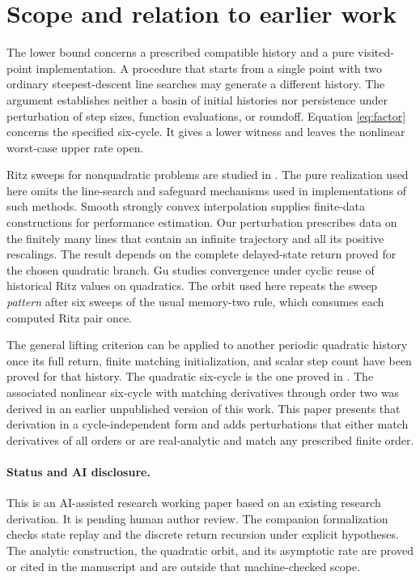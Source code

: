 \documentclass[11pt]{article}
\begin{document}
\section{Scope and relation to earlier work}

The lower bound concerns a prescribed compatible history and a
pure visited-point implementation. A procedure that starts from a
single point with two ordinary steepest-descent line searches may
generate a different history. The argument establishes neither
a basin of initial histories nor persistence under perturbation of
step sizes, function evaluations, or roundoff. Equation
\eqref{eq:factor} concerns the specified six-cycle. It gives a
lower witness and leaves the nonlinear worst-case upper rate open.

Ritz sweeps for nonquadratic problems are studied in
\cite{fletcher,ferrandi}. The pure realization used here omits the
line-search and safeguard mechanisms used in implementations of such
methods. Smooth strongly convex interpolation \cite{taylor} supplies
finite-data constructions for performance estimation. Our
perturbation prescribes data on the finitely many lines that contain
an infinite trajectory and all its positive rescalings. The result
depends on the complete delayed-state return proved for the chosen
quadratic branch. Gu \cite{gu} studies convergence under cyclic
reuse of historical Ritz values on quadratics. The orbit used here
repeats the sweep \emph{pattern} after six sweeps of the usual
memory-two rule, which consumes each computed Ritz pair once.

The general lifting criterion can be applied to another periodic
quadratic history once its full return, finite matching initialization,
and scalar step count have been proved for that history. The quadratic six-cycle is the one proved in \cite{sharp}.
The associated nonlinear six-cycle with matching derivatives
through order two was derived in an earlier unpublished version
of this work. This paper presents that derivation in a
cycle-independent form and adds perturbations that either match
derivatives of all orders or are real-analytic and match any
prescribed finite order.

\paragraph{Status and AI disclosure.}
This is an AI-assisted research working paper based on an existing
research derivation. It is pending human author review. The companion
formalization checks state replay and the discrete return recursion
under explicit hypotheses. The analytic construction, the quadratic
orbit, and its asymptotic rate are proved or cited in the manuscript
and are outside that machine-checked scope.
\end{document}
